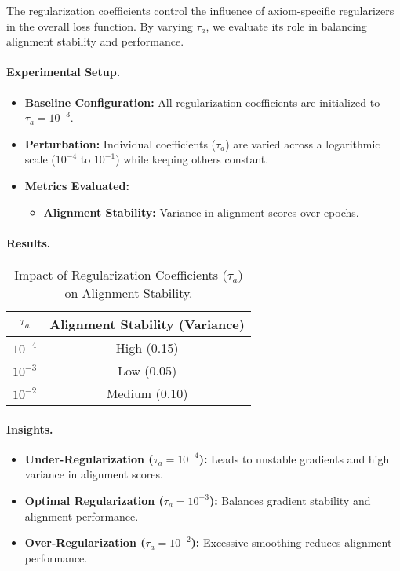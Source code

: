 The regularization coefficients control the influence of axiom-specific regularizers in the overall loss function. By varying \( \tau_a \), we evaluate its role in balancing alignment stability and performance.

\paragraph{Experimental Setup.}
\begin{itemize}
    \item \textbf{Baseline Configuration:} All regularization coefficients are initialized to \( \tau_a = 10^{-3} \).
    \item \textbf{Perturbation:} Individual coefficients (\( \tau_a \)) are varied across a logarithmic scale (\( 10^{-4} \) to \( 10^{-1} \)) while keeping others constant.
    \item \textbf{Metrics Evaluated:}
    \begin{itemize}
        \item \textbf{Alignment Stability:} Variance in alignment scores over epochs.
    \end{itemize}
\end{itemize}

\paragraph{Results.}
\begin{table}[ht!]
\centering
\caption{Impact of Regularization Coefficients (\( \tau_a \)) on Alignment Stability.}
\label{tab:regularization_ablation}
\begin{tabular}{|c|c|}
\hline
\textbf{\( \tau_a \)} & \textbf{Alignment Stability (Variance)} \\ \hline
\( 10^{-4} \)         & High (0.15)                            \\ 
\( 10^{-3} \)         & Low (0.05)                             \\ 
\( 10^{-2} \)         & Medium (0.10)                          \\ \hline
\end{tabular}
\end{table}

\paragraph{Insights.}
\begin{itemize}
    \item \textbf{Under-Regularization (\( \tau_a = 10^{-4} \)):} Leads to unstable gradients and high variance in alignment scores.
    \item \textbf{Optimal Regularization (\( \tau_a = 10^{-3} \)):} Balances gradient stability and alignment performance.
    \item \textbf{Over-Regularization (\( \tau_a = 10^{-2} \)):} Excessive smoothing reduces alignment performance.
\end{itemize}

